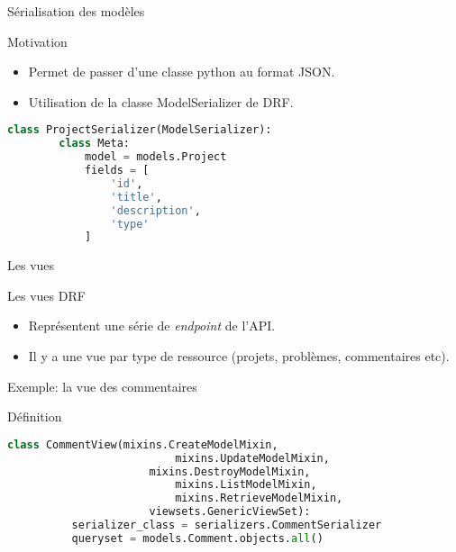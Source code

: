 \begin{frame}[fragile]{Sérialisation des modèles}
  \begin{block}{Motivation}
    \begin{itemize}
    \item Permet de passer d'une classe python au format JSON.
    \item Utilisation de la classe \textsf{ModelSerializer} de DRF.
    \end{itemize}        
  \end{block}

  \begin{center}
    \tiny
    \begin{lstlisting}[language=Python]
      class ProjectSerializer(ModelSerializer):
        class Meta:
            model = models.Project
            fields = [
                'id',
                'title',
                'description',
                'type'
            ]
    \end{lstlisting}
  \end{center}
\end{frame}

\begin{frame}[fragile]{Les vues}
  \begin{block}{Les vues DRF}
    \begin{itemize}
    \item Représentent une série de \textit{endpoint} de l'API.
    \item Il y a une vue par type de ressource (projets, problèmes, commentaires etc).
    \end{itemize}
  \end{block}
\end{frame}

\begin{frame}[fragile]{Exemple: la vue des commentaires}
  \begin{block}{Définition}
    \begin{center}    
      \tiny
      \begin{lstlisting}[language=python]
        class CommentView(mixins.CreateModelMixin,
                          mixins.UpdateModelMixin,
	                  mixins.DestroyModelMixin,
                          mixins.ListModelMixin,
                          mixins.RetrieveModelMixin,
	                  viewsets.GenericViewSet):
          serializer_class = serializers.CommentSerializer
          queryset = models.Comment.objects.all()
      \end{lstlisting}
    \end{center}
  \end{block}
\end{frame}


